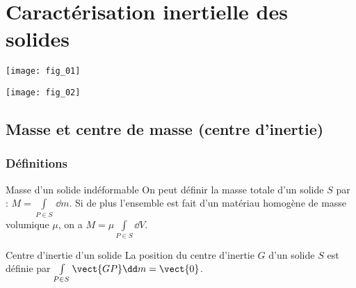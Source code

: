 \setchapterpreamble[u]{\margintoc}

\chapter{Caractérisation inertielle des solides}




\begin{marginfigure}[6.5cm]
\centering
\texttt{[image: fig\_01]}
\caption{Toupie}
\end{marginfigure}


\begin{marginfigure}[10.5cm]
\centering
\texttt{[image: fig\_02]}
\caption{Volants d'inertie d'un vilebrequin}
\end{marginfigure}



\section{Masse et centre de masse (centre d'inertie)}
\subsection{Définitions}
\begin{defi}{Masse d'un solide indéformable}
On peut définir la masse totale d'un solide $S$ par : $M=\int\limits_{P\in S} \,\dd m$. Si de plus l'ensemble est fait d'un matériau homogène de masse volumique $\mu$, on a $M=\mu \int\limits_{P\in S} \dd V$. \end{defi}


\begin{defi}{Centre d'inertie d'un solide}
La position du centre d'inertie $G$ d'un solide $S$ est définie par $\int\limits_{P\in S} \vect{GP} \dd m = \vect{0}$.
\end{defi}

